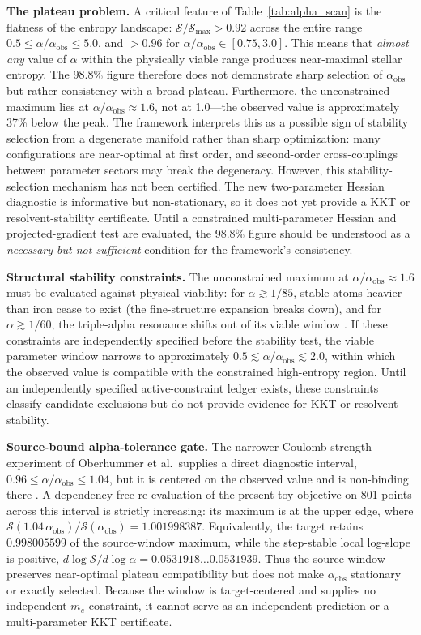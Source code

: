 \documentclass[12pt,a4paper]{article}
\theoremstyle{remark}
\begin{document}
\textbf{The plateau problem.} A critical feature of Table~\ref{tab:alpha_scan} is the flatness of the entropy landscape: $\mathcal{S}/\mathcal{S}_{\max} > 0.92$ across the entire range $0.5 \leq \alpha/\alpha_{\text{obs}} \leq 5.0$, and $> 0.96$ for $\alpha/\alpha_{\text{obs}} \in [0.75, 3.0]$. This means that \emph{almost any} value of $\alpha$ within the physically viable range produces near-maximal stellar entropy. The 98.8\% figure therefore does not demonstrate sharp selection of $\alpha_{\text{obs}}$ but rather consistency with a broad plateau. Furthermore, the unconstrained maximum lies at $\alpha/\alpha_{\text{obs}} \approx 1.6$, not at 1.0---the observed value is approximately 37\% below the peak. The framework interprets this as a possible sign of stability selection from a degenerate manifold rather than sharp optimization: many configurations are near-optimal at first order, and second-order cross-couplings between parameter sectors may break the degeneracy. However, this stability-selection mechanism has not been certified. The new two-parameter Hessian diagnostic is informative but non-stationary, so it does not yet provide a KKT or resolvent-stability certificate. Until a constrained multi-parameter Hessian and projected-gradient test are evaluated, the 98.8\% figure should be understood as a \emph{necessary but not sufficient} condition for the framework's consistency.

\textbf{Structural stability constraints.} The unconstrained maximum at $\alpha / \alpha_{\text{obs}} \approx 1.6$ must be evaluated against physical viability: for $\alpha \gtrsim 1/85$, stable atoms heavier than iron cease to exist (the fine-structure expansion breaks down), and for $\alpha \gtrsim 1/60$, the triple-alpha resonance shifts out of its viable window \citep{Adams2019}. If these constraints are independently specified before the stability test, the viable parameter window narrows to approximately $0.5 \lesssim \alpha/\alpha_{\text{obs}} \lesssim 2.0$, within which the observed value is compatible with the constrained high-entropy region. Until an independently specified active-constraint ledger exists, these constraints classify candidate exclusions but do not provide evidence for KKT or resolvent stability.

\textbf{Source-bound alpha-tolerance gate.} The narrower Coulomb-strength experiment of Oberhummer et al.\ supplies a direct diagnostic interval, $0.96\leq\alpha/\alpha_{\mathrm{obs}}\leq1.04$, but it is centered on the observed value and is non-binding there \citep{Oberhummer2000}. A dependency-free re-evaluation of the present toy objective on 801 points across this interval is strictly increasing: its maximum is at the upper edge, where $\mathcal{S}(1.04\,\alpha_{\mathrm{obs}})/\mathcal{S}(\alpha_{\mathrm{obs}})=1.001998387$. Equivalently, the target retains $0.998005599$ of the source-window maximum, while the step-stable local log-slope is positive, $d\log\mathcal{S}/d\log\alpha=0.0531918\ldots0.0531939$. Thus the source window preserves near-optimal plateau compatibility but does not make $\alpha_{\mathrm{obs}}$ stationary or exactly selected. Because the window is target-centered and supplies no independent $m_e$ constraint, it cannot serve as an independent prediction or a multi-parameter KKT certificate.
\end{document}
